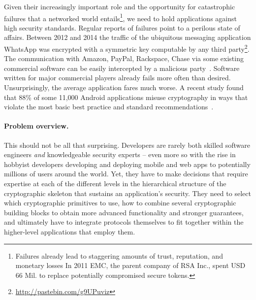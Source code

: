 \documentclass[10pt]{article}
\begin{document}
Given their increasingly important role and the opportunity for catastrophic failures that a
networked world entails\footnote{
Failures already lead to staggering amounts of trust, reputation, and monetary losses In 2011 EMC,
the parent company of RSA Inc., spent USD 66 Mil. to replace potentially compromised secure tokens.
}, we need to hold applications against high security standards.
Regular reports of failures point to a perilous state of affairs. 
Between 2012 and 2014 the traffic of the ubiquitous messaging application \textsf{WhatsApp} 
was encrypted with a symmetric key computable by any third
party\footnote{\url{http://pastebin.com/g9UPuviz}}.
The communication with \textsf{Amazon, PayPal, Rackspace, Chase} via some existing commercial
software can be easily intercepted by a malicious party~\cite{GIJABS12}.
Software written for major commercial players already fails more often than desired.  Unsurprisingly, the average
application fares much worse. 
A recent study found that 88\% of some 11,000 Android applications misuse cryptography in
ways that violate the most basic best practice and standard
recommendations~\cite{egele13anempirical}.

\paragraph*{Problem overview.}

This should not be all that surprising.   Developers are rarely both skilled software engineers \emph{and} knowledgeable security experts -- even more so with the rise in hobbyist developers developing and deploying mobile and web apps to potentially millions of users around the world. 
Yet, they have to make decisions that require expertise at each of the different levels in the hierarchical structure of the cryptographic skeleton that sustains an application's security.
They need to select which cryptographic primitives to use, how to combine several cryptographic building blocks to obtain more advanced functionality and stronger guarantees, and ultimately have to integrate protocols themselves to fit together within the higher-level applications that employ them.
\end{document}
